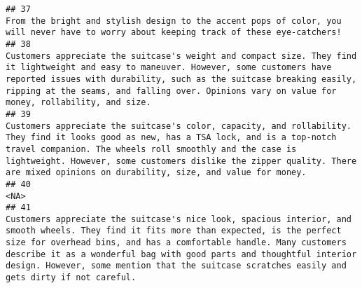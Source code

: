 \documentclass[
]{article}
\begin{document}
\begin{verbatim}
## 37                                                                                                                                                                                                                                                                                                                                                                                                                                                                                   From the bright and stylish design to the accent pops of color, you will never have to worry about keeping track of these eye-catchers! 
## 38                                                                                                                                                                                                                                                                                                           Customers appreciate the suitcase's weight and compact size. They find it lightweight and easy to maneuver. However, some customers have reported issues with durability, such as the suitcase breaking easily, ripping at the seams, and falling over. Opinions vary on value for money, rollability, and size.
## 39                                                                                                                                                                                                                                                                                    Customers appreciate the suitcase's color, capacity, and rollability. They find it looks good as new, has a TSA lock, and is a top-notch travel companion. The wheels roll smoothly and the case is lightweight. However, some customers dislike the zipper quality. There are mixed opinions on durability, size, and value for money.
## 40                                                                                                                                                                                                                                                                                                                                                                                                                                                                                                                                                                                                                       <NA>
## 41                                                                                                                                                                                                                                      Customers appreciate the suitcase's nice look, spacious interior, and smooth wheels. They find it fits more than expected, is the perfect size for overhead bins, and has a comfortable handle. Many customers describe it as a wonderful bag with good parts and thoughtful interior design. However, some mention that the suitcase scratches easily and gets dirty if not careful.

\end{verbatim}
\end{document}
